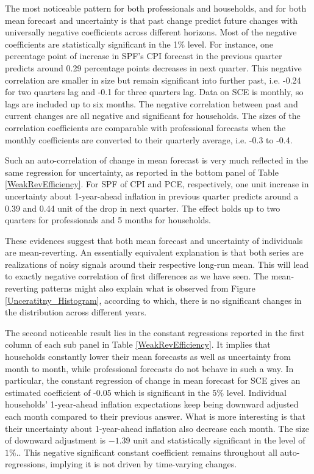 \documentclass[12pt]{article}
\begin{document}
    The most noticeable pattern for both professionals and households, and for both mean forecast and uncertainty is that past change predict future changes with universally negative coefficients across different horizons. Most of the negative coefficients are statistically significant in the 1\% level. For instance, one percentage point of increase in SPF's CPI forecast in the previous quarter predicts around 0.29 percentage points decreases in next quarter. This negative correlation are smaller in size but remain significant into further past, i.e. -0.24 for two quarters lag and -0.1 for three quarters lag. Data on SCE is monthly, so lags are included up to six months. The negative correlation between past and current changes are all negative and significant for households. The sizes of the correlation coefficients are comparable with professional forecasts when the monthly coefficients are converted to their quarterly average, i.e. -0.3 to -0.4. 
    
    Such an auto-correlation of change in mean forecast is very much reflected in the same regression for uncertainty, as reported in the bottom panel of Table \ref{WeakRevEfficiency}.  For SPF of CPI and PCE, respectively, one unit increase in uncertainty about 1-year-ahead inflation in previous quarter predicts around a 0.39 and 0.44 unit of the drop in next quarter. The effect holds up to two quarters for professionals and 5 months for households. 
    
    These evidences suggest that both mean forecast and uncertainty of individuals are mean-reverting. An essentially equivalent explanation is that both series are realizations of noisy signals around their respective long-run mean. This will lead to exactly negative correlation of first differences as we have seen. The mean-reverting patterns might also explain what is observed from Figure \ref{Unceratitny_Histogram}, according to which, there is no significant changes in the distribution across different years. 
    
    The second noticeable result lies in the constant regressions reported in the first column of each sub panel in Table \ref{WeakRevEfficiency}. It implies that households constantly lower their mean forecasts as well as uncertainty from month to month, while professional forecasts do not behave in such a way. In particular, the constant regression of change in mean forecast for SCE gives an estimated coefficient of -0.05 which is significant in the $5\%$ level. Individual households' 1-year-ahead inflation expectations keep being downward adjusted each month compared to their previous answer. What is more interesting is that their uncertainty about 1-year-ahead inflation also decrease each month.  The size of downward adjustment is  $-1.39$ unit and statistically significant in the level of $1\%.$. This negative significant constant coefficient remains throughout all auto-regressions, implying it is not driven by time-varying changes. 
\end{document}
